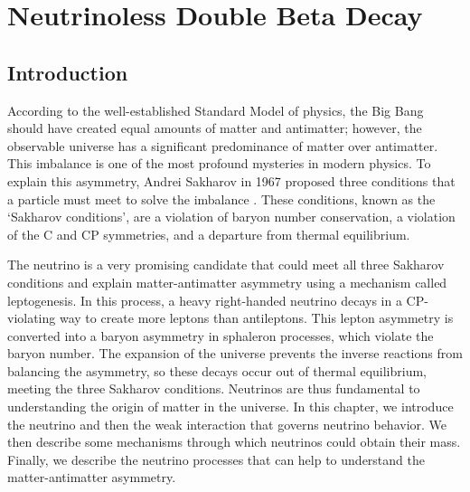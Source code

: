 \chapter{Neutrinoless Double Beta Decay}

\section{Introduction}
According to the well-established Standard Model of physics, the Big Bang should have created equal amounts of matter and antimatter; however, the observable universe has a significant predominance of matter over antimatter. This imbalance is one of the most profound mysteries in modern physics. To explain this asymmetry, Andrei Sakharov in 1967 proposed three conditions that a particle must meet to solve the imbalance \cite{sakharov_1991}. These conditions, known as the `Sakharov conditions', are a violation of baryon number conservation, a violation of the C and CP symmetries, and a departure from thermal equilibrium.

The neutrino is a very promising candidate that could meet all three Sakharov conditions and explain matter-antimatter asymmetry using a mechanism called leptogenesis. In this process, a heavy right-handed neutrino decays in a CP-violating way to create more leptons than antileptons. This lepton asymmetry is converted into a baryon asymmetry in sphaleron processes, which violate the baryon number. The expansion of the universe prevents the inverse reactions from balancing the asymmetry, so these decays occur out of thermal equilibrium, meeting the three Sakharov conditions. Neutrinos are thus fundamental to understanding the origin of matter in the universe. In this chapter, we introduce the neutrino and then the weak interaction that governs neutrino behavior. We then describe some mechanisms through which neutrinos could obtain their mass. Finally, we describe the neutrino processes that can help to understand the matter-antimatter asymmetry.

